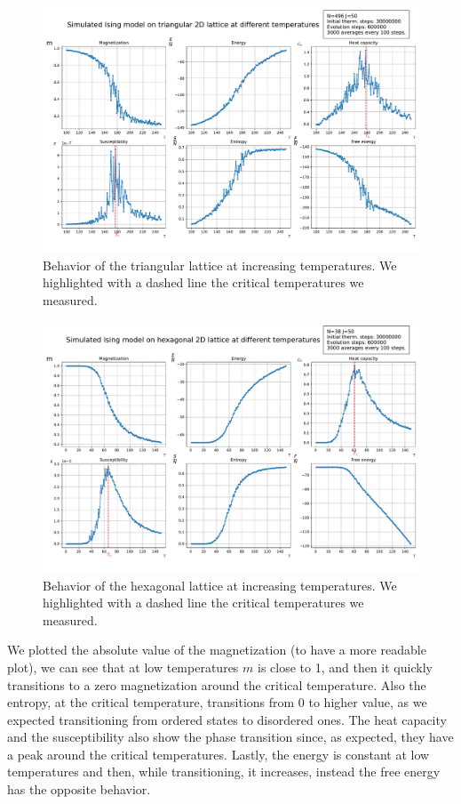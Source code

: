 \begin{figure}[!htb] 
    \includegraphics[width=\linewidth]{2d_triangular_thermal.pdf}
      \caption{Behavior of the triangular lattice at increasing temperatures. We highlighted with a dashed line the critical temperatures we measured.}\label{Fig:Behaviour2}
\end{figure}

\begin{figure}[!htb]
    \includegraphics[width=\linewidth]{2d_hexagonal_thermal.pdf}
      \caption{Behavior of the hexagonal lattice at increasing temperatures. We highlighted with a dashed line the critical temperatures we measured.}\label{Fig:Behaviour3}
\end{figure}
We plotted the absolute value of the magnetization (to have a more readable plot), we can see that at low temperatures $m$ is close to 1, and then it quickly transitions to a zero magnetization around the critical temperature. Also the entropy, at the critical temperature, transitions from 0 to higher value, as we expected transitioning from ordered states to disordered ones. The heat capacity and the susceptibility also show the phase transition since, as expected, they have a peak around the critical temperatures. Lastly, the energy is constant at low temperatures and then, while transitioning, it increases, instead the free energy has the opposite behavior.

